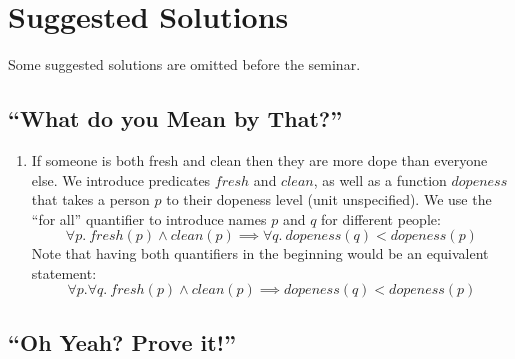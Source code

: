 \documentclass{tufte-handout}
\begin{document}
\section{Suggested Solutions}

Some suggested solutions are omitted before the seminar.

\subsection{``What do you Mean by That?''}

\begin{enumerate}
\item If someone is both fresh and clean then they are more dope
  than everyone else. We introduce predicates $\mathit{fresh}$ and
  $\mathit{clean}$, as well as a function $\mathit{dopeness}$ that
  takes a person $p$ to their dopeness level (unit unspecified).
  We use the ``for all'' quantifier to introduce names $p$ and $q$
  for different people:
  \[
  \forall p.~\mathit{fresh}(p) \land \mathit{clean}(p) \implies
  \forall q.~\mathit{dopeness}(q) < \mathit{dopeness}(p)
  \]
  Note that having both quantifiers in the beginning would be an
  equivalent statement:
  \[
  \forall p.\forall q.~\mathit{fresh}(p) \land \mathit{clean}(p) \implies
  \mathit{dopeness}(q) < \mathit{dopeness}(p)
  \]
\end{enumerate}

\subsection{``Oh Yeah? Prove it!''}
\end{document}
